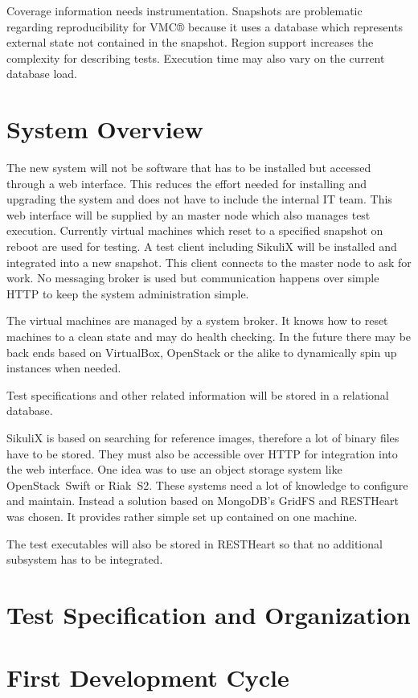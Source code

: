 \documentclass[a4paper,twocolumn]{article}
\newcommand{\VMC}[0]{VMC®}
\begin{document}
Coverage information needs instrumentation.
Snapshots are problematic regarding reproducibility for \VMC{} because it uses a database which represents external state not contained in the snapshot.
Region support increases the complexity for describing tests.
Execution time may also vary on the current database load.

\section{System Overview}
The new system will not be software that has to be installed but accessed through a web interface.
This reduces the effort needed for installing and upgrading the system and does not have to include the internal IT team.
This web interface will be supplied by an master node which also manages test execution.
Currently virtual machines which reset to a specified snapshot on reboot are used for testing.
A test client including SikuliX will be installed and integrated into a new snapshot.
This client connects to the master node to ask for work.
No messaging broker is used but communication happens over simple HTTP to keep the system administration simple.

The virtual machines are managed by a system broker.
It knows how to reset machines to a clean state and may do health checking.
In the future there may be back ends based on VirtualBox\cite{VirtualBox}, OpenStack\cite{OpenStack} or the alike to dynamically spin up instances when needed.

Test specifications and other related information will be stored in a relational database.

SikuliX is based on searching for reference images, therefore a lot of binary files have to be stored.
They must also be accessible over HTTP for integration into the web interface.
One idea was to use an object storage system like OpenStack~Swift\cite{OpenStackSwift} or Riak~S2\cite{RiakS2}.
These systems need a lot of knowledge to configure and maintain.
Instead a solution based on MongoDB's GridFS\cite{GridFS} and RESTHeart\cite{RESTHeart} was chosen.
It provides rather simple set up contained on one machine.

The test executables will also be stored in RESTHeart so that no additional subsystem has to be integrated.



\section{Test Specification and Organization}

\section{First Development Cycle}



\printbibliography[notkeyword=software]
\printbibliography[keyword=software,title={Used software}]
\end{document}
